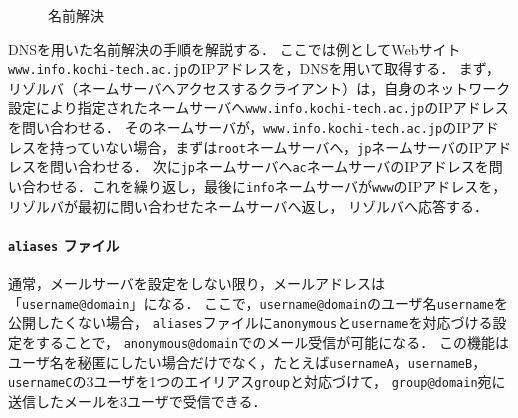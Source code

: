 \begin{wrapfigure}{r}[0mm]{.46\textwidth}
    \centering
    
    \caption{名前解決}
    \vspace{-.5cm}
\end{wrapfigure}
DNSを用いた名前解決の手順を解説する．
ここでは例としてWebサイト\texttt{www.info.kochi-tech.ac.jp}のIPアドレスを，DNSを用いて取得する．
まず，リゾルバ（ネームサーバへアクセスするクライアント）は，自身のネットワーク設定により指定されたネームサーバへ\texttt{www.info.kochi-tech.ac.jp}のIPアドレスを問い合わせる．
そのネームサーバが，\texttt{www.info.kochi-tech.ac.jp}のIPアドレスを持っていない場合，まずは\texttt{root}ネームサーバへ，\texttt{jp}ネームサーバのIPアドレスを問い合わせる．
次に\texttt{jp}ネームサーバへ\texttt{ac}ネームサーバのIPアドレスを問い合わせる．これを繰り返し，最後に\texttt{info}ネームサーバが\texttt{www}のIPアドレスを，リゾルバが最初に問い合わせたネームサーバへ返し，
リゾルバへ応答する．\hfill\cite[p.8]{DNSBIND}
\newcommand{\aliases}{\texttt{aliases}}
\newcommand{\user}{ユーザ}
\paragraph{\texttt{\bfseries aliases} ファイル}
通常，メールサーバを設定をしない限り，メールアドレスは「\texttt{username@domain}」になる．
ここで，\texttt{username@domain}の\user 名\texttt{username}を公開したくない場合，
\aliases ファイルに\texttt{anonymous}と\texttt{username}を対応づける設定をすることで，
\texttt{anonymous@domain}でのメール受信が可能になる．
この機能は\user 名を秘匿にしたい場合だけでなく，たとえば\texttt{usernameA}，\texttt{usernameB}，\texttt{usernameC}の3\user を1つのエイリアス\texttt{group}と対応づけて，
\texttt{group@domain}宛に送信したメールを3\user で受信できる．